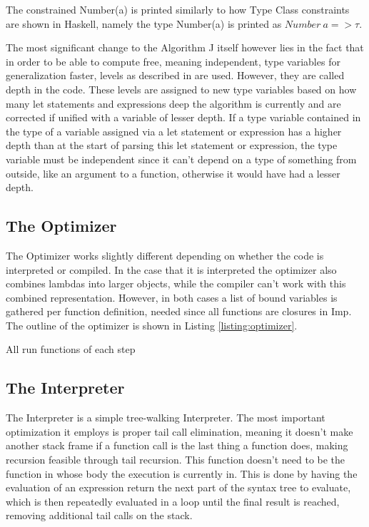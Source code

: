 \documentclass[12pt]{article}
\newcommand{\importListing}[1]{
    \begin{minipage}{\textwidth}
    
    \end{minipage}
}
\begin{document}
The constrained Number(a) is printed similarly to how Type Class
constraints are shown in Haskell, namely the type Number(a) is printed as
$Number\:a => \tau$.

The most significant change to the Algorithm J itself however
lies in the fact that in order to be able
to compute free, meaning independent, type variables for generalization
faster, levels as described in \autocite{EfficientInsightfulGeneralization2022} are
used. However, they are called depth in the code.
These levels are assigned to new type variables based on how many let statements and expressions
deep the algorithm is currently and are corrected if unified with a variable of lesser depth.
If a type variable contained in the type of a variable assigned via a let statement or expression
has a higher depth than at the start of parsing this let statement or expression, the type variable must be
independent since it can't depend on a type of something from outside, like an argument to a function, otherwise
it would have had a lesser depth.

\subsection{The Optimizer}
\importListing{code/optimizer.tex}

The Optimizer works slightly different depending on whether
the code is interpreted or compiled. In the case that it is interpreted
the optimizer also combines lambdas into larger objects,
while the compiler can't work with this combined representation.
However, in both cases a list of bound variables is gathered per function definition,
needed since all functions are closures in Imp.
The outline of the optimizer is shown in Listing \ref{listing:optimizer}.

All run functions of each step

\subsection{The Interpreter}
The Interpreter is a simple tree-walking Interpreter.
The most important optimization it employs is proper tail call elimination,
meaning it doesn't make another stack frame if a function call is the last
thing a function does, making recursion feasible through
tail recursion. This function doesn't need to be the function in whose body the
execution is currently in. This is done by having the evaluation of an expression return
the next part of the syntax tree to evaluate, which is then repeatedly evaluated in a loop until the final result
is reached, removing additional tail calls on the stack.
\end{document}
